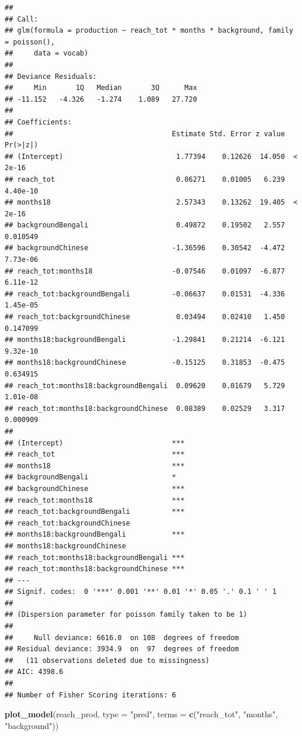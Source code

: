 \documentclass[]{article}
\newenvironment{Shaded}{\begin{snugshade}}{\end{snugshade}}
\newcommand{\DataTypeTok}[1]{\textcolor[rgb]{0.13,0.29,0.53}{#1}}
\newcommand{\KeywordTok}[1]{\textcolor[rgb]{0.13,0.29,0.53}{\textbf{#1}}}
\newcommand{\NormalTok}[1]{#1}
\newcommand{\StringTok}[1]{\textcolor[rgb]{0.31,0.60,0.02}{#1}}
\begin{document}
\begin{verbatim}
## 
## Call:
## glm(formula = production ~ reach_tot * months * background, family = poisson(), 
##     data = vocab)
## 
## Deviance Residuals: 
##     Min       1Q   Median       3Q      Max  
## -11.152   -4.326   -1.274    1.089   27.720  
## 
## Coefficients:
##                                      Estimate Std. Error z value Pr(>|z|)
## (Intercept)                           1.77394    0.12626  14.050  < 2e-16
## reach_tot                             0.06271    0.01005   6.239 4.40e-10
## months18                              2.57343    0.13262  19.405  < 2e-16
## backgroundBengali                     0.49872    0.19502   2.557 0.010549
## backgroundChinese                    -1.36596    0.30542  -4.472 7.73e-06
## reach_tot:months18                   -0.07546    0.01097  -6.877 6.11e-12
## reach_tot:backgroundBengali          -0.06637    0.01531  -4.336 1.45e-05
## reach_tot:backgroundChinese           0.03494    0.02410   1.450 0.147099
## months18:backgroundBengali           -1.29841    0.21214  -6.121 9.32e-10
## months18:backgroundChinese           -0.15125    0.31853  -0.475 0.634915
## reach_tot:months18:backgroundBengali  0.09620    0.01679   5.729 1.01e-08
## reach_tot:months18:backgroundChinese  0.08389    0.02529   3.317 0.000909
##                                         
## (Intercept)                          ***
## reach_tot                            ***
## months18                             ***
## backgroundBengali                    *  
## backgroundChinese                    ***
## reach_tot:months18                   ***
## reach_tot:backgroundBengali          ***
## reach_tot:backgroundChinese             
## months18:backgroundBengali           ***
## months18:backgroundChinese              
## reach_tot:months18:backgroundBengali ***
## reach_tot:months18:backgroundChinese ***
## ---
## Signif. codes:  0 '***' 0.001 '**' 0.01 '*' 0.05 '.' 0.1 ' ' 1
## 
## (Dispersion parameter for poisson family taken to be 1)
## 
##     Null deviance: 6616.0  on 108  degrees of freedom
## Residual deviance: 3934.9  on  97  degrees of freedom
##   (11 observations deleted due to missingness)
## AIC: 4398.6
## 
## Number of Fisher Scoring iterations: 6
\end{verbatim}

\begin{Shaded}
\begin{Highlighting}[]
\KeywordTok{plot_model}\NormalTok{(reach_prod, }\DataTypeTok{type =} \StringTok{"pred"}\NormalTok{, }\DataTypeTok{terms =} \KeywordTok{c}\NormalTok{(}\StringTok{"reach_tot"}\NormalTok{, }\StringTok{"months"}\NormalTok{, }\StringTok{"background"}\NormalTok{))}
\end{Highlighting}
\end{Shaded}
\end{document}

